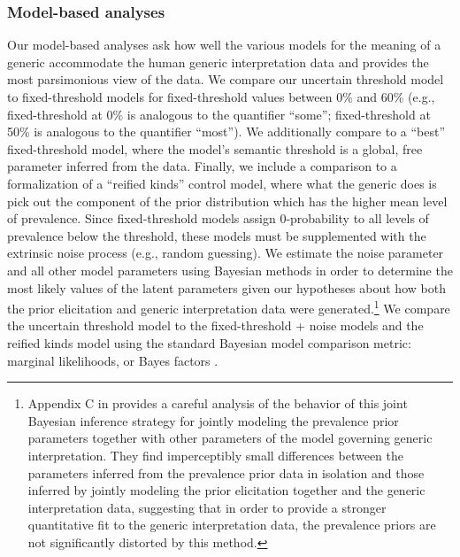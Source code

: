\documentclass[floatsintext,doc]{apa6}
\let\rmarkdownfootnote\footnote%
\def\footnote{\protect\rmarkdownfootnote}
\newcommand{\ndg}[1]{{\textcolor{Green}{[ndg: #1]}}}
\begin{document}
\hypertarget{model-based-analyses}{%
\subsubsection{Model-based analyses}\label{model-based-analyses}}

Our model-based analyses ask how well the various models for the meaning of a generic accommodate the human generic interpretation data and provides the most parsimonious view of the data.
We compare our uncertain threshold model to fixed-threshold models for fixed-threshold values between 0\% and 60\% (e.g., fixed-threshold at 0\% is analogous to the quantifier ``some''; fixed-threshold at 50\% is analogous to the quantifier ``most''). 
We additionally compare to a ``best'' fixed-threshold model, where the model's semantic threshold is a global, free parameter inferred from the data. 
Finally, we include a comparison to a formalization of a ``reified kinds'' control model, where what the generic does is pick out the component of the prior distribution which has the higher mean level of prevalence. 
Since fixed-threshold models assign 0-probability to all levels of prevalence below the threshold, these models must be supplemented with the extrinsic noise process (e.g., random guessing).
We estimate the noise parameter and all other model parameters using Bayesian methods in order to determine the most likely values of the latent parameters given our hypotheses about how both the prior elicitation and generic interpretation data were generated.\footnote{Appendix C in  provides a careful analysis of the behavior of this joint Bayesian inference strategy for jointly modeling the prevalence prior parameters together with other parameters of the model governing generic interpretation. They find imperceptibly small differences between the parameters inferred from the prevalence prior data in isolation and those inferred by jointly modeling the prior elicitation together and the generic interpretation data, suggesting that in order to provide a stronger quantitative fit to the generic interpretation data, the prevalence priors are not significantly distorted by this method.}
We compare the uncertain threshold model to the fixed-threshold + noise models and the reified kinds model using the standard Bayesian model comparison metric: marginal likelihoods, or Bayes factors \cite{LeeWagenmakers2014}.
\end{document}
